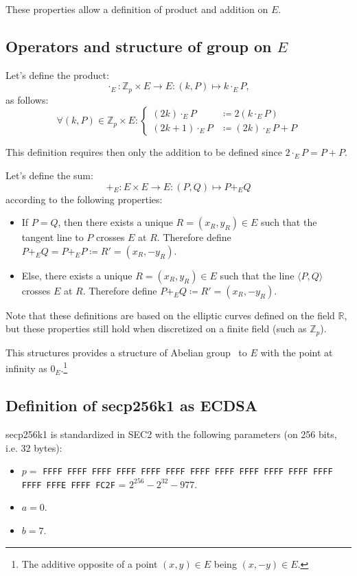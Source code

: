 \documentclass{IEEEtran}
\begin{document}
	These properties allow a definition of product and addition on $E$.

	\subsection{Operators and structure of group on $E$}

	Let's define the product:
	\begin{equation}\label{eq:def prod}
		\cdot_E : \mathbb Z_p \times E \to E : (k, P) \mapsto k \cdot_E P,
	\end{equation}
	as follows:
	\[\forall (k, P) \in \mathbb Z_p \times E : \begin{cases}(2k) \cdot_E P &\coloneqq 2\left(k \cdot_E P\right) \\(2k+1) \cdot_E P &\coloneqq (2k) \cdot_E P + P\end{cases}\]

	This definition requires then only the addition to be defined since $2 \cdot_E P = P + P$.

	Let's define the sum:
	\begin{equation}\label{eq:def sum}
		+_E : E \times E \to E : (P, Q) \mapsto P +_E Q
	\end{equation}
	according to the following properties:
	\begin{itemize}
		\item If $P=Q$, then there exists a unique $R = (x_R, y_R) \in E$ such that the tangent line to
		$P$ crosses $E$ at $R$. Therefore define $P +_E Q = P +_E P \coloneqq R' = (x_R, -y_R)$.
		\item Else, there exists a unique $R = (x_R, y_R) \in E$ such that the line $\langle P, Q \rangle$
		crosses $E$ at $R$. Therefore define $P +_E Q \coloneqq R' = (x_R, -y_R)$.
	\end{itemize}

	Note that these definitions are based on the elliptic curves defined on the field $\mathbb R$, but
	these properties still hold when discretized on a finite field (such as $\mathbb Z_p$).

	This structures provides a structure of Abelian group~\cite{Koblitz87} to $E$ with the point at infinity as $0_E$.\footnote{
	The additive opposite of a point $(x, y) \in E$ being $(x, -y) \in E$.}

	\subsection{Definition of secp256k1 as ECDSA}
	secp256k1 is standardized in SEC2 with the following parameters (on 256 bits, i.e. 32 bytes):
	\begin{itemize}
		\item $p =$ \texttt{FFFF FFFF FFFF FFFF FFFF FFFF FFFF FFFF FFFF FFFF FFFF FFFF FFFF FFFE FFFF FC2F}
		= $2^{256} - 2^{32} - 977$.
		\item $a = 0$.
		\item $b = 7$.
	\end{itemize}
\end{document}
